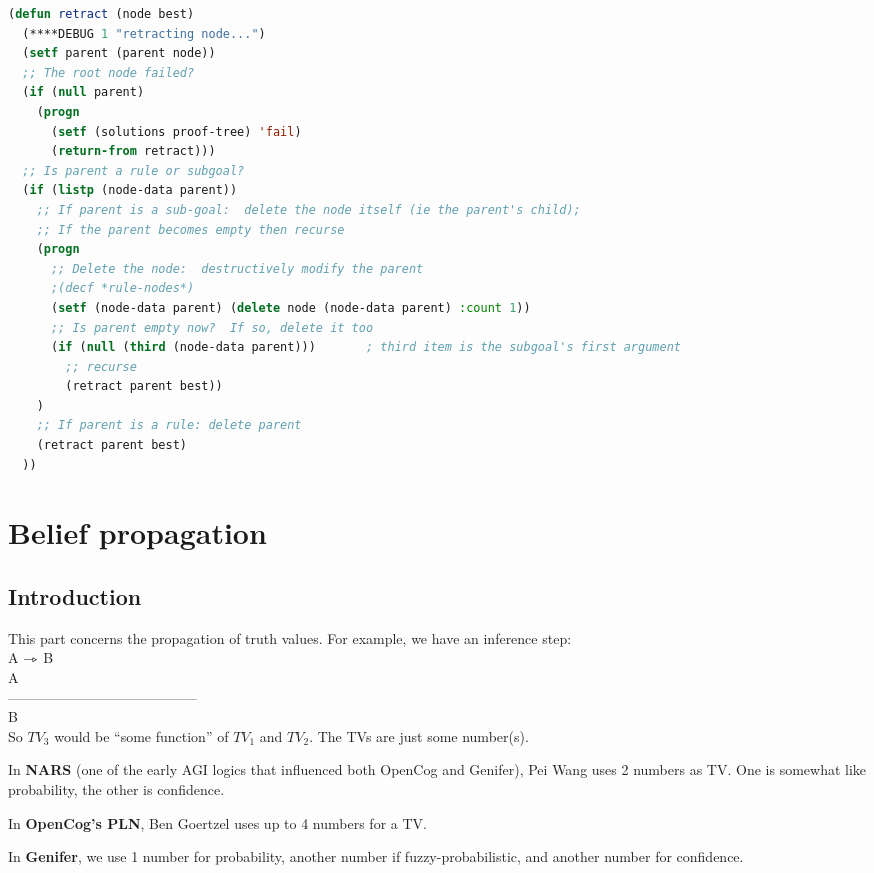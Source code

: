 \begin{lstlisting}[language=Lisp]
(defun retract (node best)
  (****DEBUG 1 "retracting node...")
  (setf parent (parent node))
  ;; The root node failed?
  (if (null parent)
    (progn
      (setf (solutions proof-tree) 'fail)
      (return-from retract)))
  ;; Is parent a rule or subgoal?
  (if (listp (node-data parent))
    ;; If parent is a sub-goal:  delete the node itself (ie the parent's child);
    ;; If the parent becomes empty then recurse
    (progn
      ;; Delete the node:  destructively modify the parent
      ;(decf *rule-nodes*)
      (setf (node-data parent) (delete node (node-data parent) :count 1))
      ;; Is parent empty now?  If so, delete it too
      (if (null (third (node-data parent)))       ; third item is the subgoal's first argument
        ;; recurse
        (retract parent best))
    )
    ;; If parent is a rule: delete parent
    (retract parent best)
  ))
\end{lstlisting}

\section{Belief propagation}

\subsection{Introduction}

This part concerns the propagation of truth values.  For example, we
have an inference step:\\
\tab A $\rightarrowtriangle$ B    \tab {} \\
\tab A              \tab\tab {} \\
\tab -----------------------------------------  \\
\tab B              \tab\tab {} \\
So $TV_3$ would be ``some function'' of $TV_1$ and $TV_2$.  The TVs are just some number(s).

In \textbf{NARS} (one of the early AGI logics that influenced both OpenCog and Genifer), Pei Wang uses
2 numbers as TV.  One is somewhat like probability, the other is confidence.

In \textbf{OpenCog's PLN}, Ben Goertzel uses up to 4 numbers for a TV.

In \textbf{Genifer}, we use 1 number for probability, another number if fuzzy-probabilistic, and
another number for confidence.

